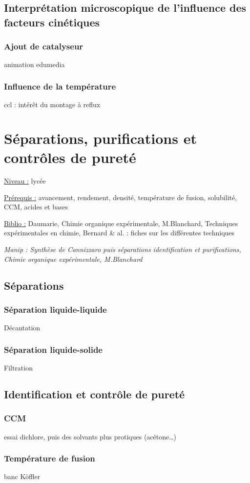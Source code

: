 \documentclass{article}%
\begin{document}
\subsection{Interprétation microscopique de l'influence des facteurs cinétiques}
\subsubsection{Ajout de catalyseur}
animation edumedia
\subsubsection{Influence de la température}

ccl : intérêt du montage à reflux
\section{Séparations, purifications et contrôles de pureté}
\underline{Niveau :} lycée

\underline{Prérequis :} avancement, rendement, densité, température de fusion, solubilité, CCM, acides et bases

\underline{Biblio :} Daumarie, Chimie organique expérimentale, M.Blanchard, Techniques expérimentales en chimie, Bernard \& al. : fiches sur les différentes techniques 

\textit{Manip : Synthèse de Cannizzaro puis séparations identification et purifications, Chimie organique expérimentale, M.Blanchard}
\subsection{Séparations}
\subsubsection{Séparation liquide-liquide}
Décantation
\subsubsection{Séparation liquide-solide}
Filtration
\subsection{Identification et contrôle de pureté}
\subsubsection{CCM}
essai dichlore, puis des solvants plus protiques (acétone\dots)
\subsubsection{Température de fusion}
banc Köffler
\end{document}
